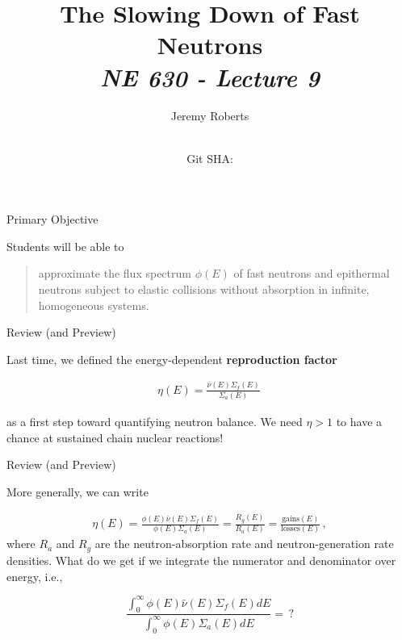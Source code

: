 \documentclass[aspectratio=1610]{beamer}
\title{The Slowing Down of Fast Neutrons \\
       {\small\it NE 630 - Lecture 9}}
\date{ \\ {\footnotesize Git SHA: }}
\author{Jeremy Roberts}
\begin{document}
\begin{frame}
\titlepage
\end{frame}
 
 
\begin{frame}{Primary Objective}

Students will be able to 

\vfill

\begin{quote}
\textcolor{wcprimary}{approximate the flux spectrum $\phi(E)$ of fast neutrons and epithermal neutrons subject to elastic collisions without absorption in infinite, homogeneous systems.}
\end{quote}

\vfill 

\end{frame}

\begin{frame}{Review (and Preview)}

Last time, we defined the energy-dependent
{\bf reproduction factor}

\begin{align*}
  \eta(E) = \frac{\bar{\nu}(E) \Sigma_f(E)}{\Sigma_{a}(E)} \, 
\tag{FNRP 3.3} 
\end{align*}

as a first step toward quantifying neutron balance.  We need $\eta > 1$ to have a chance at sustained chain nuclear reactions!


\begin{figure}[h]
    \centering
    \resizebox{0.95\textwidth}{!}{}
\end{figure}


\end{frame}


\begin{frame}{Review (and Preview)}

 
More generally, we can write 

\begin{align*}
     \eta(E)  =  \frac{\phi(E) \bar{\nu}(E) \Sigma_f(E)}
                   {\phi(E) \Sigma_{a}(E)} = \frac{R_{g}(E)}{R_a(E)} = \frac{\text{gains}(E)}{\text{losses}(E)} \,  ,
\end{align*}
where $R_a$ and $R_{g}$ are the neutron-absorption rate and neutron-generation rate densities.
What do we get if we integrate the numerator and denominator over energy, i.e.,

\begin{equation*}
 \frac{\int^{\infty}_0  \phi( E) \bar{\nu}(E) \Sigma_f(E)  dE}
                   {\int^{\infty}_0  \phi( E) \Sigma_{a}( E) dE} =  \, ?
\end{equation*}


\end{frame}
\end{document}
